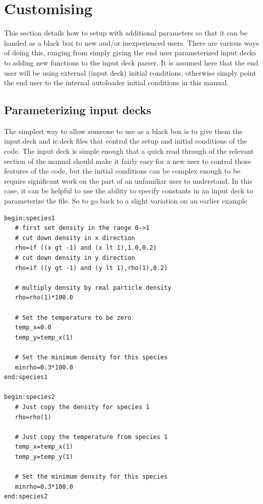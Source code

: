 \documentclass[12pt,a4paper]{article}
\newcommand{\simpleboxverbatim}{\begin{Verbatim}[obeytabs=true,frame=single,
  framerule=0.5mm,rulecolor=\color{warwickmid},formatcom=\color{black}]}
\newcommand{\EPOCH}{{\color{warwickdark}\fontfamily{phv}\selectfont{EPOCH}}}
\begin{document}
\section{Customising {\EPOCH}}
This section details how to setup {\EPOCH} with additional parameters so that it
can be handed as a black box to new and/or inexperienced users. There are
various ways of doing this, ranging from simply giving the end user
parameterized input decks to adding new functions to the input deck parser. It
is assumed here that the end user will be using external (input deck) initial
conditions, otherwise simply point the end user to the internal autoloader
initial conditions in this manual.

\subsection{Parameterizing input decks}
The simplest way to allow someone to use {\EPOCH} as a black box is to give them
the input.deck and ic.deck files that control the setup and initial conditions
of the code. The input deck is simple enough that a quick read through of the
relevant section of the manual should make it fairly easy for a new user to
control those features of the code, but the initial conditions can be complex
enough to be require significant work on the part of an unfamiliar user to
understand. In this case, it can be helpful to use the ability to specify
constants in an input deck to parameterize the file. So to go back to a slight
variation on an earlier example


\simpleboxverbatim
begin:species1
   # first set density in the range 0->1
   # cut down density in x direction
   rho=if ((x gt -1) and (x lt 1),1.0,0.2)
   # cut down density in y direction
   rho=if ((y gt -1) and (y lt 1),rho(1),0.2)

   # multiply density by real particle density
   rho=rho(1)*100.0

   # Set the temperature to be zero
   temp_x=0.0
   temp_y=temp_x(1)

   # Set the minimum density for this species
   minrho=0.3*100.0
end:species1

begin:species2
   # Just copy the density for species 1
   rho=rho(1)

   # Just copy the temperature from species 1
   temp_x=temp_x(1)
   temp_y=temp_y(1)

   # Set the minimum density for this species
   minrho=0.3*100.0
end:species2
\end{Verbatim}
\end{document}
